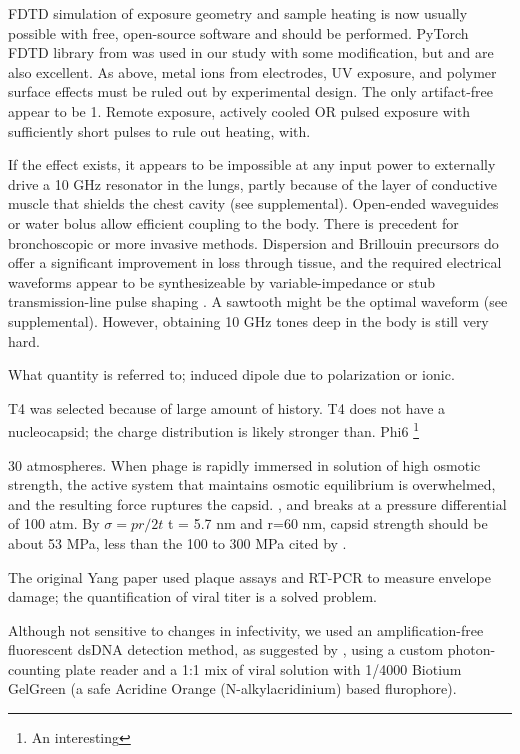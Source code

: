 \documentclass[paper.tex]{subfiles}
\begin{document}
FDTD simulation of exposure geometry and sample heating is now usually possible with free, open-source software and should be performed. PyTorch FDTD library from \cite{Highly2019} was used in our study with some modification, but \cite{CUDAbased2019} and \cite{openEMS} are also excellent. As above, metal ions from electrodes, UV exposure, and polymer surface effects\cite{Effect1994a} must be ruled out by experimental design. The only artifact-free appear to be 1. Remote exposure, actively cooled OR pulsed exposure with sufficiently short pulses to rule out heating, with. 

If the effect exists, it appears to be impossible at any input power to externally drive a 10 GHz resonator in the lungs, partly because of the layer of conductive muscle that shields the chest cavity (see supplemental). Open-ended waveguides\cite{142018} or water bolus allow efficient coupling to the body. There is precedent for bronchoscopic \cite{Flexible2019}\cite{Antenna2018} or more invasive methods. Dispersion and Brillouin precursors do offer a significant improvement in loss through tissue, and the required electrical waveforms appear to be synthesizeable by variable-impedance or stub transmission-line pulse shaping\cite{Arbitrarya} . A sawtooth might be the optimal waveform (see supplemental). However, obtaining 10 GHz tones deep in the body is still very hard.


What quantity is referred to; induced dipole due to polarization or ionic.

T4 was selected because of large amount of history. T4 does not have a nucleocapsid; the charge distribution is likely stronger than. 
Phi6 \footnote{An interesting}

30 atmospheres. When phage is rapidly immersed in solution of high osmotic strength, the active system that maintains osmotic equilibrium is overwhelmed, and the resulting force ruptures the capsid. \cite{Osmotic2003}, and breaks at a pressure differential of 100 atm. By $\sigma = pr / 2t $ t = 5.7 nm\cite{Head1988} and r=60 nm, capsid strength should be about 53 MPa, less than the 100 to 300 MPa cited by \cite{Bacteriophage2004}.

The original Yang paper used plaque assays and RT-PCR to measure envelope damage; the quantification of viral titer is a solved problem. 

Although not sensitive to changes in infectivity, we used an amplification-free fluorescent dsDNA detection method, as suggested by \cite{Quantification2020}, using a custom photon-counting plate reader and a 1:1 mix of viral solution with 1/4000 Biotium GelGreen (a safe Acridine Orange (N-alkylacridinium) based flurophore). 
\end{document}

